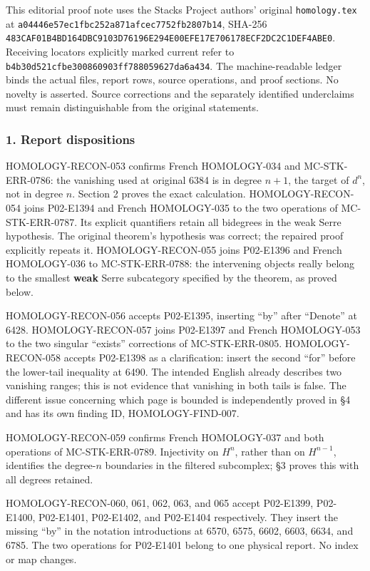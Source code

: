 \documentclass[11pt]{article}
\begin{document}
This editorial proof note uses the Stacks Project authors' original \texttt{homology.tex} at \texttt{a04446e57ec1fbc252a871afcec7752fb2807b14}, SHA-256 \texttt{483CAF01B4BD164DBC9103D76196E294E00EFE17E706178ECF2DC2C1DEF4ABE0}. Receiving locators explicitly marked current refer to \texttt{b4b30d521cfbe300860903ff788059627da6a434}. The machine-readable ledger binds the actual files, report rows, source operations, and proof sections. No novelty is asserted. Source corrections and the separately identified underclaims must remain distinguishable from the original statements.

\subsubsection{1. Report dispositions}\label{report-dispositions}

HOMOLOGY-RECON-053 confirms French HOMOLOGY-034 and MC-STK-ERR-0786: the vanishing used at original 6384 is in degree \(n+1\), the target of \(d^n\), not in degree \(n\). Section 2 proves the exact calculation. HOMOLOGY-RECON-054 joins P02-E1394 and French HOMOLOGY-035 to the two operations of MC-STK-ERR-0787. Its explicit quantifiers retain all bidegrees in the weak Serre hypothesis. The original theorem's hypothesis was correct; the repaired proof explicitly repeats it. HOMOLOGY-RECON-055 joins P02-E1396 and French HOMOLOGY-036 to MC-STK-ERR-0788: the intervening objects really belong to the smallest \textbf{weak} Serre subcategory specified by the theorem, as proved below.

HOMOLOGY-RECON-056 accepts P02-E1395, inserting ``by'' after ``Denote'' at 6428. HOMOLOGY-RECON-057 joins P02-E1397 and French HOMOLOGY-053 to the two singular ``exists'' corrections of MC-STK-ERR-0805. HOMOLOGY-RECON-058 accepts P02-E1398 as a clarification: insert the second ``for'' before the lower-tail inequality at 6490. The intended English already describes two vanishing ranges; this is not evidence that vanishing in both tails is false. The different issue concerning which page is bounded is independently proved in §4 and has its own finding ID, HOMOLOGY-FIND-007.

HOMOLOGY-RECON-059 confirms French HOMOLOGY-037 and both operations of MC-STK-ERR-0789. Injectivity on \(H^n\), rather than on \(H^{n-1}\), identifies the degree-\(n\) boundaries in the filtered subcomplex; §3 proves this with all degrees retained.

HOMOLOGY-RECON-060, 061, 062, 063, and 065 accept P02-E1399, P02-E1400, P02-E1401, P02-E1402, and P02-E1404 respectively. They insert the missing ``by'' in the notation introductions at 6570, 6575, 6602, 6603, 6634, and 6785. The two operations for P02-E1401 belong to one physical report. No index or map changes.
\end{document}
